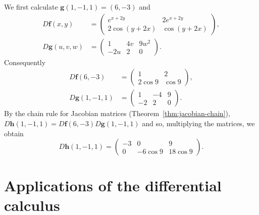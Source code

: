 \begin{solution}
    We first calculate \(\mathbf{g}(1,-1,1) = (6,-3)\) and
    \[
        \begin{aligned}
            D\mathbf{f}(x,y)   & =
            \begin{pmatrix}
                e^{x+2y}     & 2 e^{x+2y} \\
                2 \cos(y+2x) & \cos(y+2x)
            \end{pmatrix}, \\
            D\mathbf{g}(u,v,w) & =
            \begin{pmatrix}
                1   & 4v & 9w^2 \\
                -2u & 2  & 0
            \end{pmatrix}.
        \end{aligned}
    \]
    Consequently
    \[
        \begin{aligned}
            D\mathbf{f}(6,-3)   & =
            \begin{pmatrix}
                1        & 2      \\
                2 \cos 9 & \cos 9
            \end{pmatrix},       \\
            D\mathbf{g}(1,-1,1) & =
            \begin{pmatrix}
                1  & -4 & 9 \\
                -2 & 2  & 0
            \end{pmatrix}.
        \end{aligned}
    \]
    By the chain rule for Jacobian matrices (Theorem~\ref{thm:jacobian-chain}),
    \( D\mathbf{h}(1,-1,1) = D\mathbf{f}(6,-3)  D\mathbf{g}(1,-1,1) \)
    and so, multiplying the matrices, we obtain
    $$D\mathbf{h}(1,-1,1) =
        \begin{pmatrix}
            -3 & 0        & 9        \\
            0  & -6\cos 9 & 18\cos 9
        \end{pmatrix}.
    $$
\end{solution}


\section{Applications of the differential calculus}


